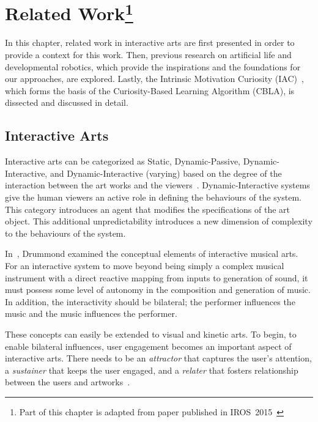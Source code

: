\chapter[Related Work]{Related Work\footnote{Part of this chapter is adapted from paper published in IROS~2015~\cite{Chan2015}}} 
 \label{chap:related_work}

In this chapter, related work in interactive arts are first presented in order to provide a context for this work. Then, previous research on artificial life and developmental robotics, which provide the inspirations and the foundations for our approaches, are explored. Lastly, the Intrinsic Motivation Curiosity (IAC)~\cite{Oudeyer2007}, which forms the basis of the Curiosity-Based Learning Algorithm (CBLA), is dissected and discussed in detail.

\section{Interactive Arts}
Interactive arts can be categorized as Static, Dynamic-Passive, Dynamic-Interactive, and Dynamic-Interactive (varying) based on the degree of the interaction between the art works and the viewers~\cite{Edmonds2004}. Dynamic-Interactive systems give the human viewers an active role in defining the behaviours of the system. This category introduces an agent that modifies the specifications of the art object. This additional unpredictability introduces a new dimension of complexity to the behaviours of the system. 

In~\cite{Drummond2009}, Drummond examined the conceptual elements of interactive musical arts. For an interactive system to move beyond being simply a complex musical instrument with a direct reactive mapping from inputs to generation of sound, it must possess some level of autonomy in the composition and generation of music. In addition, the interactivity should be bilateral; the performer influences the music and the music influences the performer. 

These concepts can easily be extended to visual and kinetic arts. To begin, to enable bilateral influences, user engagement becomes an important aspect of interactive arts. There needs to be an \textit{attractor} that captures the user's attention, a \textit{sustainer} that keeps the user engaged, and a \textit{relater} that fosters relationship between the users and artworks~\cite{Edmonds2006}. 


